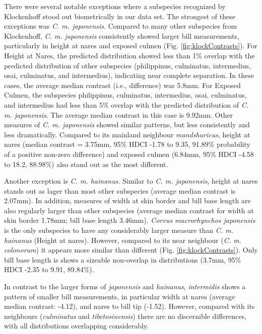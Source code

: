 \documentclass[10pt,a4paper]{article}
\begin{document}
There were several notable exceptions where a subspecies recognized by Klockenhoff stood out biometrically in our data set.
The strongest of these exceptions was \emph{C. m. japonensis}.
Compared to many other subspecies from Klockenhoff, \emph{C. m. japonensis} consistently showed larger bill measurements, particularly in height at nares and exposed culmen (Fig. \ref{fig:klockContrasts}).
For Height at Nares, the predicted distribution showed less than 1\% overlap with the predicted distribution of other subspecies (philippinus, culminatus, intermedius, osai, culminatus, and intermedius), indicating near complete separation.
In these cases, the average median contrast (i.e., difference) was 5.8mm.
For Exposed Culmen, the subspecies philippinus, culminatus, intermedius, osai, culminatus, and intermedius had less than 5\% overlap with the predicted distribution of \emph{C. m. japonensis}.
The average median contrast in this case is 9.92mm.
Other measures of \emph{C. m. japonensis} showed similar patterns, but less consistently and less dramatically.
Compared to its mainland neighbour \emph{mandshuricus}, height at nares (median contrast = 3.75mm, 95\% HDCI -1.78 to 9.35, 91.89\% probability of a positive non-zero difference) and exposed culmen (6.84mm, 95\% HDCI -4.58 to 18.2, 88.98\%) also stand out as the most different.

Another exception is \emph{C. m. hainanus}.
Similar to \emph{C. m. japonensis}, height at nares stands out as lager than most other subspecies (average median contrast is 2.07mm).
In addition, measures of width at skin border and bill base length are also regularly larger than other subspecies (average median contrast for width at skin border 1.78mm; bill base length 3.46mm).
\emph{Corvus macrorhynchos japonensis} is the only subspecies to have any considerably larger measure than \emph{C. m. hainanus} (Height at nares).
However, compared to its near neighbour (\emph{C. m. colonorum}) it appears more similar than different (Fig. \ref{fig:klockContrasts}).
Only bill base length is shows a sizeable non-overlap in distributions (3.7mm, 95\% HDCI -2.35 to 9.91, 89.84\%).

In contrast to the larger forms of \emph{japonensis} and \emph{hainanus}, \emph{intermidis} shows a pattern of smaller bill measurements, in particular width at nares (average median contrast: -4.12), and nares to bill tip (-1.52).
However, compared with its neighbours (\emph{culminatus} and \emph{tibetosinensis}) there are no discernible differences, with all distributions overlapping considerably.
\end{document}

